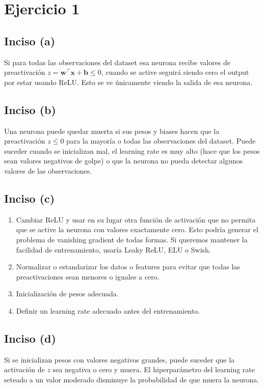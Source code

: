 \documentclass[12pt, a4paper]{article}
\begin{document}
    \section*{Ejercicio 1}
        \subsection*{Inciso (a)}
            \noindent Si para todas las observaciones del dataset esa neurona recibe valores de preactivación $z = \mathbf{w}^{\top} \mathbf{x} + \mathbf{b} \leq 0$, cuando se active seguirá siendo cero el output por estar usando ReLU. Esto se ve únicamente viendo la salida de esa neurona.
        \subsection*{Inciso (b)}
            \noindent Una neurona puede quedar muerta si sus pesos y biases hacen que la preactivación $z \leq 0$ para la mayoría o todas las observaciones del dataset. Puede suceder cuando se inicializan mal, el learning rate es muy alto (hace que los pesos sean valores negativos de golpe) o que la neurona no pueda detectar algunos valores de las observaciones.
        \subsection*{Inciso (c)}
            \begin{enumerate}
                \item Cambiar ReLU y usar en su lugar otra función de activación que no permita que se active la neurona con valores exactamente cero. Esto podría generar el problema de vanishing gradient de todas formas. Si queremos mantener la facilidad de entrenamiento, usaría Leaky ReLU, ELU o Swish.
                \item Normalizar o estandarizar los datos o features para evitar que todas las preactivaciones sean menores o iguales a cero.
                \item Inicialización de pesos adecuada.
                \item Definir un learning rate adecuado antes del entrenamiento.
            \end{enumerate}
        \subsection*{Inciso (d)}
            \noindent Si se inicializan pesos con valores negativos grandes, puede suceder que la activación de $z$ sea negativa o cero y muera. El hiperparámetro del learning rate seteado a un valor moderado disminuye la probabilidad de que muera la neurona.
\end{document}
